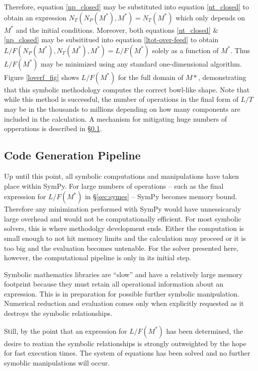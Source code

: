 \documentclass[preprint,12pt]{elsarticle}
\begin{document}
Therefore, equation \ref{np_closed} may be substituted into equation \ref{nt_closed}
to obtain an expression $N_T(N_P(M^*),M^*)=N_T(M^*)$ which only depends on $M^*$ and 
the initial conditions.  Moreover, both equations \ref{nt_closed} \& \ref{np_closed}
may be subsititued into equation \ref{ltot-over-feed} to obtain 
$L/F(N_P(M^*),N_T(M^*),M^*)=L/F(M^*)$ solely as a function of $M^*$.  Thus
$L/F(M^*)$ may be minimized using any standard one-dimensional algorithm.
Figure \ref{loverf_fig} shows $L/F(M^*)$ for the full domain of $M*$, demonstrating 
that this symbolic methodology computes the correct bowl-like shape.  Note that while 
this method is successful, the number of operations in the final form of $L/T$ may be 
in the thousands to millions depending on how many components are included in the 
calculation.  A mechanism for mitigating huge numbers of opperations is described
in \S \ref{sec:codegen}.


\subsection{Code Generation Pipeline}
\label{sec:codegen}

Up until this point, all symbolic computations and manipulations have taken place
within SymPy.  For large numbers of operations -- such as the final expression for
$L/F(M^*)$ in \S\ref{sec:symes} -- SymPy becomes memory bound.  Therefore any 
minimization performed with SymPy would have unnessicaraly large overhead and would
not be computationally efficient.  For most symbolic solvers, this is where
methodolgy development ends.  Either the computation is small enough to not hit
memory limits and the calculation may proceed or it is too big and the evaluation
becomes untenable.  For the solver presented here, however, the computational 
pipeline is only in its initial step.

Symbolic mathematics libraries are ``slow'' and have a relatively large memory 
footprint because they must retain all operational information about an expression.
This is in preparation for possible further symbolic manipulation.  Numerical 
reduction and evaluation comes only when explicitly requested as it destroys the 
symbolic relationships.

Still, by the point that an expression for $L/F(M^*)$ has been determined, the 
desire to reatian the symbolic relationships is strongly outweighted by the hope
for fast execution times.  The system of equations has been solved and no further
symoblic manipulations will occur.
\end{document}
